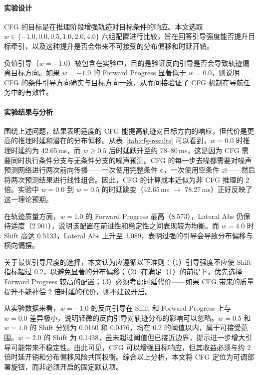 \paragraph*{实验设计}

CFG 的目标是在推理阶段增强轨迹对目标条件的响应\cite{cfg2022}。本文选取 $w\in\{-1.0,0.0,0.5,1.0,2.0,4.0\}$ 六组配置进行比较，旨在回答引导强度能否提升目标牵引，以及这种提升是否会带来不可接受的分布偏移和时延开销。

负值引导（$w=-1.0$）被包含在实验中，目的是验证反向引导是否会导致轨迹偏离目标方向。如果 $w=-1.0$ 的 Forward Progress 显著低于 $w=0.0$，则说明 CFG 的条件引导方向确实与目标方向一致，从而间接验证了 CFG 机制在导航任务中的有效性。

\paragraph*{实验结果与分析}

围绕上述问题，结果表明适度的 CFG 能提高轨迹对目标方向的响应，但代价是更高的推理时延和潜在的分布偏移。从表~\ref{tab:cfg-results} 可以看到，$w=0.0$ 时推理时延约为 42.65\,ms，而 $w \geq 0.5$ 后时延跃升至约 78--80\,ms，这是因为 CFG 需要同时执行条件分支与无条件分支的噪声预测。CFG 的每一步去噪都需要对噪声预测网络进行两次前向传播——一次使用完整条件 $\mathbf{c}$，一次使用空条件 $\varnothing$——然后将两次预测结果进行线性组合。因此，CFG 的计算成本近似为非 CFG 推理的 2 倍。实验中 $w=0.0$ 到 $w=0.5$ 的时延跳变（42.65\,ms $\to$ 78.27\,ms）正好反映了这一理论预期。

在轨迹质量方面，$w=1.0$ 的 Forward Progress 最高（8.573），Lateral Abs 仍保持适度（2.901），说明该配置在前进性和稳定性之间表现较为均衡。而 $w=4.0$ 时 Shift 高达 0.5133，Lateral Abs 上升至 3.089，表明过强的引导会导致分布偏移与横向偏摆。

关于最优引导尺度的选择，本文认为应遵循以下准则：（1）引导强度不应使 Shift 指标超过 0.2，以避免显著的分布偏移；（2）在满足（1）的前提下，优先选择 Forward Progress 较高的配置；（3）必须考虑时延代价——如果 CFG 带来的质量提升不能补偿 2 倍时延的代价，则不建议开启。

从实验数据来看，$w=-1.0$ 的反向引导在 Shift 和 Forward Progress 上与 $w=0.0$ 差异极小，说明轻微的反向引导对轨迹分布的影响可以忽略。$w=0.5$ 和 $w=1.0$ 的 Shift 分别为 0.0160 和 0.0476，均在 0.2 的阈值以内，属于可接受范围。$w=2.0$ 的 Shift 为 0.1438，虽未超过阈值但已接近边界，提示进一步增大引导可能带来不稳定性。由此可见，CFG 可以增强目标响应，但其收益必须与约 2 倍时延开销和分布偏移风险共同权衡。综合以上分析，本文将 CFG 定位为可调部署旋钮，而非必须开启的固定默认项。

